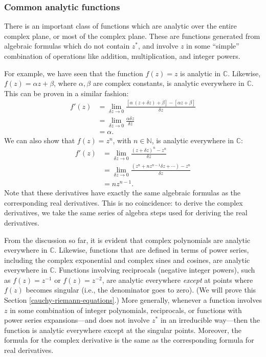 \documentclass[10pt,a4paper]{article}
\begin{document}
\subsubsection{Common analytic functions}
\label{common-analytic-functions}

There is an important class of functions which are analytic over the
entire complex plane, or most of the complex plane. These are
functions generated from algebraic formulas which do not contain
$z^*$, and involve $z$ in some ``simple'' combination of operations
like addition, multiplication, and integer powers.

For example, we have seen that the function $f(z) = z$ is analytic in
$\mathbb{C}$. Likewise, $f(z) = \alpha z + \beta$, where $\alpha,
\beta$ are complex constants, is analytic everywhere in
$\mathbb{C}$. This can be proven in a similar fashion:
\begin{align}
  f'(z) &= \lim_{\delta z\rightarrow 0} \frac{[\alpha\,(z+\delta z) + \beta] - [\alpha z + \beta]}{\delta z} \\&= \lim_{\delta z\rightarrow 0} \frac{\alpha \delta z}{\delta z} \\&= \alpha.
\end{align}
We can also show that $f(z) = z^n$, with $n \in \mathbb{N}$, is
analytic everywhere in $\mathbb{C}$:
\begin{align}
  f'(z) &= \lim_{\delta z\rightarrow 0} \frac{(z+\delta z)^n - z^n}{\delta z} \\&=
  \lim_{\delta z\rightarrow 0} \frac{(z^n + n z^{n-1} \delta z + \cdots) - z^n}{\delta z} \\&= n z^{n-1}.
\end{align}
Note that these derivatives have exactly the same algebraic formulas as
the corresponding real derivatives. This is no coincidence: to derive
the complex derivatives, we take the same series of algebra steps used
for deriving the real derivatives.

From the discussion so far, it is evident that complex polynomials are
analytic everywhere in $\mathbb{C}$. Likewise, functions that are
defined in terms of power series, including the complex exponential
and complex sines and cosines, are analytic everywhere in
$\mathbb{C}$. Functions involving reciprocals (negative integer
powers), such as $f(z) = z^{-1}$ or $f(z) = z^{-2}$, are analytic
everywhere \emph{except} at points where $f(z)$ becomes singular
(i.e., the denominator goes to zero). (We will prove this Section
\ref{cauchy-riemann-equations}.) More generally, whenever a function
involves $z$ in some combination of integer polynomials, reciprocals,
or functions with power series expansions---and does not involve $z^*$
in an irreducible way---then the function is analytic everywhere
except at the singular points. Moreover, the formula for the complex
derivative is the same as the corresponding formula for real
derivatives.
\end{document}
